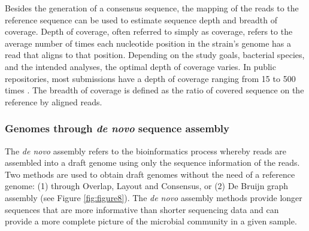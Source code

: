 Besides the generation of a consensus sequence, the mapping of the reads to the reference sequence can be used to estimate sequence depth and breadth of coverage. 
Depth of coverage, often referred to simply as coverage, refers to the average number of times each nucleotide position in the strain's genome has a read that aligns to that position. Depending on the study goals, bacterial species, and the intended analyses, the optimal depth of coverage varies. 
In public repositories, most submissions have a depth of coverage ranging from 15 to 500 times \citep{carrico_primer_2018}. 
The breadth of coverage is defined as the ratio of covered sequence on the reference by aligned reads.

\subsubsection{Genomes through \textit{de novo} sequence assembly}

The \textit{de novo} assembly refers to the bioinformatics process whereby reads are assembled into a draft genome using only the sequence information of the reads. Two methods are used to obtain draft genomes without the need of a reference genome: (1) through Overlap, Layout and Consensus, or (2) De Bruijn graph assembly (see Figure \ref{fig:figure8}). The \textit{de novo} assembly methods provide longer sequences that are more informative than shorter sequencing data and can provide a more complete picture of the microbial community in a given sample.

